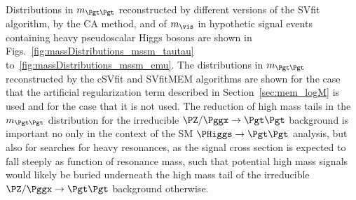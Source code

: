 Distributions in $m_{\Pgt\Pgt}$ reconstructed by different versions of
the SVfit algorithm, by the CA method, and of $m_{\vis}$ in hypothetic signal events containing heavy
pseudoscalar Higgs bosons are shown in
Figs.~\ref{fig:massDistributions_mssm_tautau}
to~\ref{fig:massDistributions_mssm_emu}.
The distributions in $m_{\Pgt\Pgt}$ reconstructed by the cSVfit and
SVfitMEM algorithms are shown for the case that the artificial regularization
term described in Section~\ref{sec:mem_logM} is used and for the case that it is not used. 
The reduction of high mass tails in the $m_{\Pgt\Pgt}$ distribution
for the irreducible $\PZ/\Pggx \to \Pgt\Pgt$
background is important no only in the context of the SM $\PHiggs \to
\Pgt\Pgt$ analysis, but also for searches for heavy resonances, as the signal cross section is expected to fall steeply as function of resonance mass,
such that potential high mass signals would likely be buried underneath the high mass tail of the irreducible $\PZ/\Pggx \to \Pgt\Pgt$ background otherwise.

